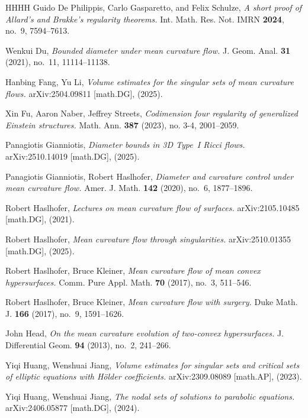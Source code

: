 \documentclass[11pt,reqno]{amsart}
\numberwithin{equation}{section}
\theoremstyle{definition}
\theoremstyle{remark}
\theoremstyle{remark}
\theoremstyle{remark}
\theoremstyle{remark}\newtheorem{conjecture}[equation]{Conjecture}
\theoremstyle{remark}\newtheorem{question}[equation]{Question}
\begin{document}
\begin{thebibliography}{HHHH}
Guido De Philippis, Carlo Gasparetto, and Felix Schulze,
\emph{A short proof of Allard’s and Brakke’s regularity theorems.}
Int. Math. Res. Not. IMRN \textbf{2024}, no.~9, 7594–7613.


Wenkui Du,
\emph{Bounded diameter under mean curvature flow.}
J. Geom. Anal. \textbf{31} (2021), no.~11, 11114–11138.

Hanbing Fang, Yu Li,
\emph{Volume estimates for the singular sets of mean curvature flows.}
arXiv:2504.09811 [math.DG], (2025).

Xin Fu, Aaron Naber, Jeffrey Streets, \emph{Codimension four regularity of generalized Einstein structures. }Math. Ann. \textbf{387} (2023), no. 3-4, 2001–2059.


Panagiotis Gianniotis,
\emph{Diameter bounds in 3D Type~I Ricci flows.}
arXiv:2510.14019 [math.DG], (2025).

Panagiotis Gianniotis, Robert Haslhofer,
\emph{Diameter and curvature control under mean curvature flow.}
Amer. J. Math. \textbf{142} (2020), no.~6, 1877–1896.



Robert Haslhofer,
\emph{Lectures on mean curvature flow of surfaces.}
arXiv:2105.10485 [math.DG], (2021).

Robert Haslhofer,
\emph{Mean curvature flow through singularities.}
arXiv:2510.01355 [math.DG], (2025).

Robert Haslhofer, Bruce Kleiner,
\emph{Mean curvature flow of mean convex hypersurfaces.}
Comm. Pure Appl. Math. \textbf{70} (2017), no.~3, 511–546.

Robert Haslhofer, Bruce Kleiner,
\emph{Mean curvature flow with surgery.}
Duke Math. J. \textbf{166} (2017), no.~9, 1591–1626.

John Head,
\emph{On the mean curvature evolution of two-convex hypersurfaces.}
J. Differential Geom. \textbf{94} (2013), no.~2, 241–266.



Yiqi Huang, Wenshuai Jiang,
\emph{Volume estimates for singular sets and critical sets of elliptic equations with Hölder coefficients.}
arXiv:2309.08089 [math.AP], (2023).

Yiqi Huang, Wenshuai Jiang,
\emph{The nodal sets of solutions to parabolic equations.}
arXiv:2406.05877 [math.DG], (2024).








\end{thebibliography}
\end{document}
